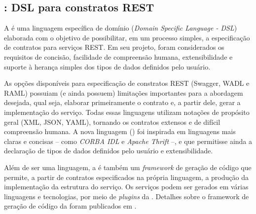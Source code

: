 \subsection{\neoidl{}: DSL para constratos REST}
 

A \neoidl{} é uma linguagem específica de domínio (\textit{Domain Specific
Language - DSL}) elaborada com o objetivo de possibilitar, em um processo
simples, a especificação de contratos para serviços REST. Em seu projeto, 
foram considerados os requisitos de concisão, facilidade de compreensão humana,
extensibilidade e suporte à herança simples dos tipos de dados definidos pelo
usuário.

As opções disponíveis para especificação de constratos REST (Swagger\cite{swaggerSite}, WADL\cite{hadley2006web} e
RAML\cite{RAML}) possuiam (e ainda possuem) limitações importantes para a
abordagem desejada, qual seja, elaborar primeiramente o contrato e, a
partir dele, gerar a implementação do serviço. Todas essas linguagens utilizam
notações de propósito geral (XML\cite{XML}, JSON\cite{JSon}, YAML\cite{YAML}),
tornando os contratos extensos e de difícil compreensão humana. A nova
linguagem (\neoidl{}) foi inspirada em linguagens mais claras e
concisas -- como \emph{CORBA IDL}\texttrademark \cite{corba} e \emph{Apache
Thrift}\texttrademark\cite{thrift} --, e que permitisse ainda a declaração de
tipos de dados definidos pelo usuário e extensibilidade. 

Além de ser uma linguagem, a \neoidl{} é também um \textit{framework} de geração
de código que permite, a partir de contratos especificados na própria
linguagem, a produção da implementação da estrutura do serviço. Os serviços
podem ser gerados em várias linguagens e tecnologias, por meio
de \textit{plugins} da \neoidl{}. Detalhes sobre o
framework de geração de código da \neoidl{} foram publicados em
\cite{lima2015neoidl}. 

% 

